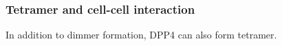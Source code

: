 \subsubsection{Tetramer and cell-cell interaction}

In addition to dimmer formation, DPP4 can also form tetramer. 